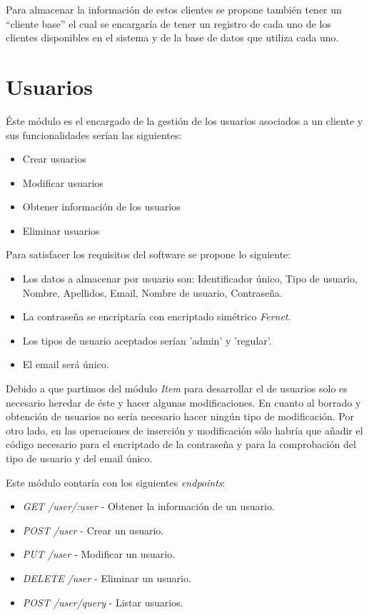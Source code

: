 Para almacenar la información de estos clientes se propone también tener un ``cliente base'' el cual se encargaría de tener un registro de cada uno de los clientes disponibles en el sistema y de la base de datos que utiliza cada uno.



\section{Usuarios}

Éste módulo es el encargado de la gestión de los usuarios asociados a un cliente y sus funcionalidades serían las siguientes:
\begin{itemize}
	\item Crear usuarios
	\item Modificar usuarios
	\item Obtener información de los usuarios
	\item Eliminar usuarios
\end{itemize}


\bigskip
Para satisfacer los requisitos del software se propone lo siguiente:
\begin{itemize}
	\item Los datos a almacenar por usuario son: Identificador único, Tipo de usuario, Nombre, Apellidos, Email, Nombre de usuario, Contraseña.
	\item La contraseña se encriptaría con encriptado simétrico \textit{Fernet}.
	\item Los tipos de usuario aceptados serían 'admin' y 'regular'.
	\item El email será único.
\end{itemize}



\bigskip
Debido a que partimos del módulo \textit{Item} para desarrollar el de usuarios solo es necesario heredar de éste y hacer algunas modificaciones. En cuanto al borrado y obtención de usuarios no sería necesario hacer ningún tipo de modificación. Por otro lado, en las operaciones de inserción y modificación sólo habría que añadir el código necesario para el encriptado de la contraseña y para la comprobación del tipo de usuario y del email único.

\bigskip
Este módulo contaría con los siguientes \textit{endpoints}:
\begin{itemize}
	\item \textit{GET /user/:user} - Obtener la información de un usuario.
	\item \textit{POST /user} - Crear un usuario.
	\item \textit{PUT /user} - Modificar un usuario.
	\item \textit{DELETE /user} - Eliminar un usuario.
	\item \textit{POST /user/query} - Listar usuarios.
\end{itemize} 





